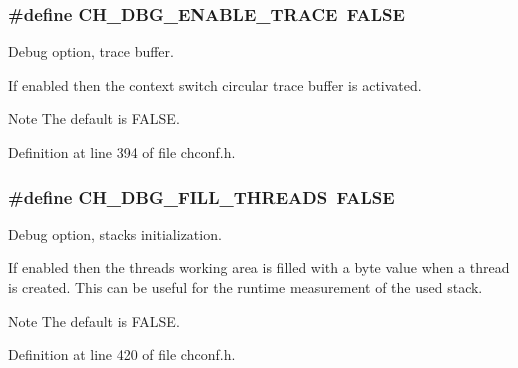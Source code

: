 \subsubsection[{C\+H\+\_\+\+D\+B\+G\+\_\+\+E\+N\+A\+B\+L\+E\+\_\+\+T\+R\+A\+C\+E}]{\setlength{\rightskip}{0pt plus 5cm}\#define C\+H\+\_\+\+D\+B\+G\+\_\+\+E\+N\+A\+B\+L\+E\+\_\+\+T\+R\+A\+C\+E~F\+A\+L\+S\+E}\label{group__config_ga8bc4cfd861131aeb3c880347d0068229}


Debug option, trace buffer. 

If enabled then the context switch circular trace buffer is activated.

\begin{DoxyNote}{Note}
The default is {\ttfamily F\+A\+L\+S\+E}. 
\end{DoxyNote}


Definition at line 394 of file chconf.\+h.

\hypertarget{group__config_ga6a859dd249adfb66b9bbf809061ea06c}{}
\subsubsection[{C\+H\+\_\+\+D\+B\+G\+\_\+\+F\+I\+L\+L\+\_\+\+T\+H\+R\+E\+A\+D\+S}]{\setlength{\rightskip}{0pt plus 5cm}\#define C\+H\+\_\+\+D\+B\+G\+\_\+\+F\+I\+L\+L\+\_\+\+T\+H\+R\+E\+A\+D\+S~F\+A\+L\+S\+E}\label{group__config_ga6a859dd249adfb66b9bbf809061ea06c}


Debug option, stacks initialization. 

If enabled then the threads working area is filled with a byte value when a thread is created. This can be useful for the runtime measurement of the used stack.

\begin{DoxyNote}{Note}
The default is {\ttfamily F\+A\+L\+S\+E}. 
\end{DoxyNote}


Definition at line 420 of file chconf.\+h.

\hypertarget{group__config_ga10db71bc25605169dddc82c1604b0a16}{}
